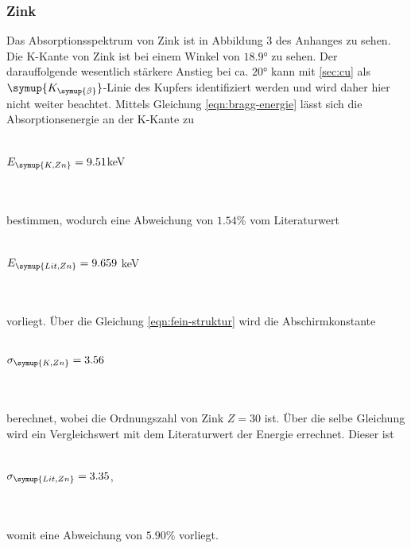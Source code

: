         \subsubsection{Zink}
            Das Absorptionsspektrum von Zink ist in Abbildung 3 des Anhanges zu sehen.
            Die K-Kante von Zink ist bei einem Winkel von $18.9°$ zu sehen. Der darauffolgende
            wesentlich stärkere Anstieg bei ca. $20°$ kann mit \autoref{sec:cu} als 
            $\symup{K_{\symup{\beta}}}$-Linie des Kupfers identifiziert werden und wird
            daher hier nicht weiter beachtet. Mittels Gleichung \eqref{eqn:bragg-energie} lässt sich
            die Absorptionsenergie an der K-Kante zu 
            \\ \\
            \centerline{$E_{\symup{K, Zn}} = 9.51$keV}
            \\ \\
            bestimmen, wodurch eine Abweichung von $1.54 \%$ vom Literaturwert
            \\ \\
            \centerline{$E_{\symup{Lit, Zn}} = 9.659$ keV \cite{periodic}}
            \\ \\
            vorliegt. Über die Gleichung \eqref{eqn:fein-struktur} wird die Abschirmkonstante 
            \\ \\
            \centerline{$\sigma_{\symup{K, Zn}} = 3.56$}
            \\ \\
            berechnet, wobei die Ordnungszahl von Zink $Z = 30$ ist.
            Über die selbe Gleichung wird ein Vergleichswert mit dem Literaturwert der Energie 
            errechnet. Dieser ist
            \\ \\
            \centerline{$\sigma_{\symup{Lit, Zn}} = 3.35$,}
            \\ \\
            womit eine Abweichung von $5.90 \%$ vorliegt.
